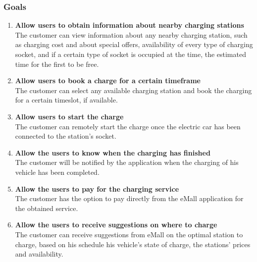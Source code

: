\subsubsection{Goals}
\begin{enumerate}[label=$\bullet$ \textbf{G\arabic*:}]
        \item \textbf{Allow users to obtain information about nearby charging stations}
        \\
        The customer can view information about any nearby charging station, 
        such as charging cost and about special offers, availability of every type of charging socket, 
        and if a certain type of socket is occupied at the time,
         the estimated time for the first to be free.
        \item \textbf{Allow users to book a charge for a certain timeframe}
        \\
        The customer can select any available charging station and book the charging for a certain timeslot, if available. 
        \item \textbf{Allow users to start the charge}
        \\
        The customer can remotely start the charge once the electric car has been connected to the station's socket.
        \item \textbf{Allow the users to know when the charging has finished}
        \\
        The customer will be notified by the application when the charging of his vehicle has been completed.
        \item \textbf{Allow the users to pay for the charging service}
        \\
        The customer has the option to pay directly from the eMall application for the obtained service.
        \item \textbf{Allow the users to receive suggestions on where to charge}
        \\
        The customer can receive suggestions from eMall on the optimal station to charge, based on his schedule his vehicle's state of charge, the stations' prices and availability.
        

\end{enumerate}
